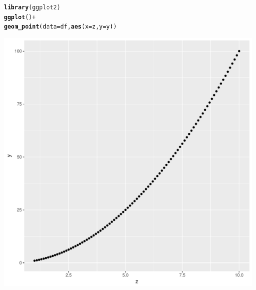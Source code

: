 \documentclass{article}\usepackage[]{graphicx}\usepackage[]{color}
\makeatletter
\def\maxwidth{ %
  \ifdim\Gin@nat@width>\linewidth
    \linewidth
  \else
    \Gin@nat@width
  \fi
}
\newcommand{\hlopt}[1]{\textcolor[rgb]{0,0,0}{#1}}%
\newcommand{\hlstd}[1]{\textcolor[rgb]{0.345,0.345,0.345}{#1}}%
\newcommand{\hlkwc}[1]{\textcolor[rgb]{0.333,0.667,0.333}{#1}}%
\newcommand{\hlkwd}[1]{\textcolor[rgb]{0.737,0.353,0.396}{\textbf{#1}}}%
\newenvironment{kframe}{%
 \def\at@end@of@kframe{}%
 \ifinner\ifhmode%
  \def\at@end@of@kframe{\end{minipage}}%
  \begin{minipage}{\columnwidth}%
 \fi\fi%
 \def\FrameCommand##1{\hskip\@totalleftmargin \hskip-\fboxsep
 \colorbox{shadecolor}{##1}\hskip-\fboxsep
     \hskip-\linewidth \hskip-\@totalleftmargin \hskip\columnwidth}%
 \MakeFramed {\advance\hsize-\width
   \@totalleftmargin\z@ \linewidth\hsize
   \@setminipage}}%
 {\par\unskip\endMakeFramed%
 \at@end@of@kframe}
\newenvironment{knitrout}{}{} %
\makeatother
\begin{document}
\begin{knitrout}
\color{fgcolor}\begin{kframe}
\begin{alltt}
\hlkwd{library}\hlstd{(ggplot2)}
\hlkwd{ggplot}\hlstd{()}\hlopt{+}
  \hlkwd{geom_point}\hlstd{(}\hlkwc{data}\hlstd{=df,}\hlkwd{aes}\hlstd{(}\hlkwc{x}\hlstd{=z,}\hlkwc{y}\hlstd{=y))}
\end{alltt}
\end{kframe}
\includegraphics[width=\maxwidth]{figure/unnamed-chunk-10-1} 

\end{knitrout}
\end{document}
